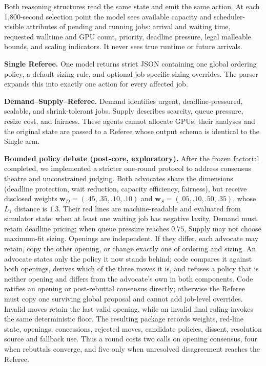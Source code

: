 \documentclass[conference]{IEEEtran}
\begin{document}
Both reasoning structures read the same state and emit the same action.  At each 1,800-second selection
point the model sees available capacity and scheduler-visible attributes of pending and running
jobs: arrival and waiting time, requested walltime and GPU count, priority, deadline pressure,
legal malleable bounds, and scaling indicators.  It never sees true runtime or future arrivals.

\textbf{Single Referee.} One model returns strict JSON containing one global ordering policy, a
default sizing rule, and optional job-specific sizing overrides.  The parser expands this into
exactly one action for every affected job.

\textbf{Demand--Supply--Referee.} Demand identifies urgent, deadline-pressured, scalable, and
shrink-tolerant jobs. Supply describes scarcity, queue pressure, resize cost, and fairness.  These
agents cannot allocate GPUs; their analyses and the original state are passed to a Referee whose
output schema is identical to the Single arm.

\textbf{Bounded policy debate (post-core, exploratory).}  After the frozen factorial completed, we
implemented a stricter one-round protocol to address consensus theatre and unconstrained judging.
Both advocates share the dimensions (deadline protection, wait reduction, capacity efficiency,
fairness), but receive disclosed weights
$\mathbf{w}_{D}=(.45,.35,.10,.10)$ and $\mathbf{w}_{S}=(.05,.10,.50,.35)$, whose
$L_1$ distance is $1.3$.  Their red lines are machine-readable and evaluated from simulator state:
when at least one waiting job has negative laxity, Demand must retain deadline pricing; when queue
pressure reaches $0.75$, Supply may not choose maximum-fit sizing.  Openings are independent.  If
they differ, each advocate may retain, copy the other opening, or change exactly one of ordering and
sizing.  An advocate states only the policy it now stands behind; code compares it against both
openings, derives which of the three moves it is, and refuses a policy that is neither opening and
differs from the advocate's own in both components.
Code ratifies an opening or post-rebuttal consensus directly; otherwise the Referee must
copy one surviving global proposal and cannot add job-level overrides.  Invalid moves retain the
last valid opening, while an invalid final ruling invokes the same deterministic floor.  The resulting
package records weights, red-line state, openings, concessions, rejected moves, candidate policies,
dissent, resolution source and fallback use.  Thus a round costs two calls on opening consensus,
four when rebuttals converge, and five only when unresolved disagreement reaches the Referee.
\end{document}
